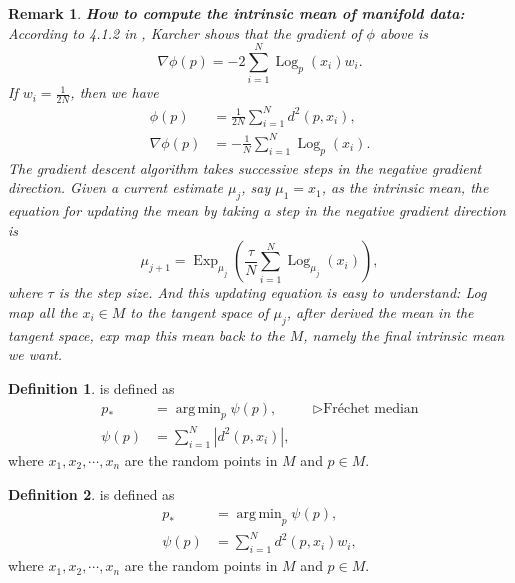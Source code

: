 \documentclass[a4paper]{article}
\theoremstyle{definition}
\newtheorem{definition}{Definition}
\theoremstyle{plain}
\newtheorem{remark}{Remark}
\DeclareMathOperator*{\argmin}{arg\,min}
\begin{document}
\begin{remark}\label{intrinsicmean}
\textbf{How to compute the intrinsic mean of manifold data:} According to 4.1.2 in \cite{tomthesis}, Karcher\cite{karcher} shows that the gradient of $\phi$ above is
\begin{equation*}
    \nabla\phi(p)=-2\sum^N_{i=1}\operatorname{Log}_p(x_i)w_i.
\end{equation*}
If $w_i=\frac{1}{2N}$, then we have
\begin{align*}
    \phi(p)&=\frac{1}{2N}\sum^N_{i=1}d^2(p,x_i),\\
    \nabla\phi(p)&=-\frac{1}{N}\sum^N_{i=1}\operatorname{Log}_p(x_i).
\end{align*}
The gradient descent algorithm takes successive steps in the negative gradient direction. Given a current estimate $\mu_j$, say $\mu_1=x_1$, as the intrinsic mean, the equation for updating the mean by taking a step in the negative gradient direction is
\begin{equation*}
    \mu_{j+1}=\operatorname{Exp}_{\mu_j}\left(\frac{\tau}{N}\sum^N_{i=1}\operatorname{Log}_{\mu_j}(x_i)\right),
\end{equation*}
where $\tau$ is the step size.
And this updating equation is easy to understand: Log map all the $x_i\in M$ to the tangent space of $\mu_j$, after derived the mean in the tangent space, exp map this mean back to the $M$, namely the final intrinsic mean we want.
\end{remark}

\begin{definition}
 is defined as
\begin{align*}
    p_*&=\argmin_p\psi(p), && \triangleright\text{Fréchet median}\\
    \psi(p)&=\sum^N_{i=1}|d^2(p,x_i)|,
\end{align*}
where $x_1,x_2,\cdots,x_n$ are the random points in $M$ and $p\in M$.
\end{definition}

\begin{definition}
 is defined as
\begin{align*}
    p_*&=\argmin_p\psi(p),\\
    \psi(p)&=\sum^N_{i=1}d^2(p,x_i)w_i,
\end{align*}
where $x_1,x_2,\cdots,x_n$ are the random points in $M$ and $p\in M$.
\end{definition}
\end{document}
